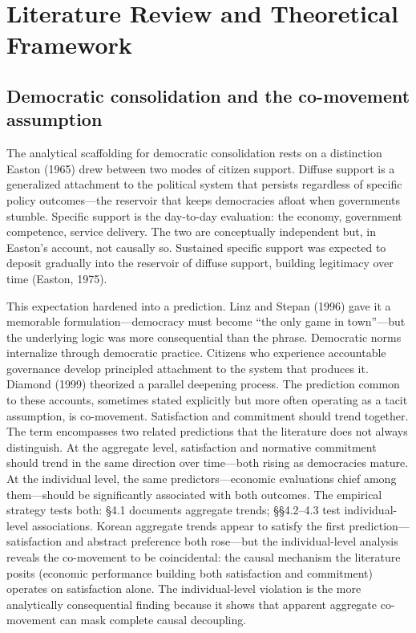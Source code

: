 \documentclass[
  12pt,
  12pt,
  letterpaper]{article}
\begin{document}
\section{Literature Review and Theoretical
Framework}\label{literature-review-and-theoretical-framework}

\subsection{Democratic consolidation and the co-movement
assumption}\label{democratic-consolidation-and-the-co-movement-assumption}

The analytical scaffolding for democratic consolidation rests on a
distinction Easton (1965) drew between two modes of citizen support.
Diffuse support is a generalized attachment to the political system that
persists regardless of specific policy outcomes---the reservoir that
keeps democracies afloat when governments stumble. Specific support is
the day-to-day evaluation: the economy, government competence, service
delivery. The two are conceptually independent but, in Easton's account,
not causally so. Sustained specific support was expected to deposit
gradually into the reservoir of diffuse support, building legitimacy
over time (Easton, 1975).

This expectation hardened into a prediction. Linz and Stepan (1996) gave
it a memorable formulation---democracy must become ``the only game in
town''---but the underlying logic was more consequential than the
phrase. Democratic norms internalize through democratic practice.
Citizens who experience accountable governance develop principled
attachment to the system that produces it. Diamond (1999) theorized a
parallel deepening process. The prediction common to these accounts,
sometimes stated explicitly but more often operating as a tacit
assumption, is co-movement. Satisfaction and commitment should trend
together. The term encompasses two related predictions that the
literature does not always distinguish. At the aggregate level,
satisfaction and normative commitment should trend in the same direction
over time---both rising as democracies mature. At the individual level,
the same predictors---economic evaluations chief among them---should be
significantly associated with both outcomes. The empirical strategy
tests both: §4.1 documents aggregate trends; §§4.2--4.3 test
individual-level associations. Korean aggregate trends appear to satisfy
the first prediction---satisfaction and abstract preference both
rose---but the individual-level analysis reveals the co-movement to be
coincidental: the causal mechanism the literature posits (economic
performance building both satisfaction and commitment) operates on
satisfaction alone. The individual-level violation is the more
analytically consequential finding because it shows that apparent
aggregate co-movement can mask complete causal decoupling.
\end{document}
